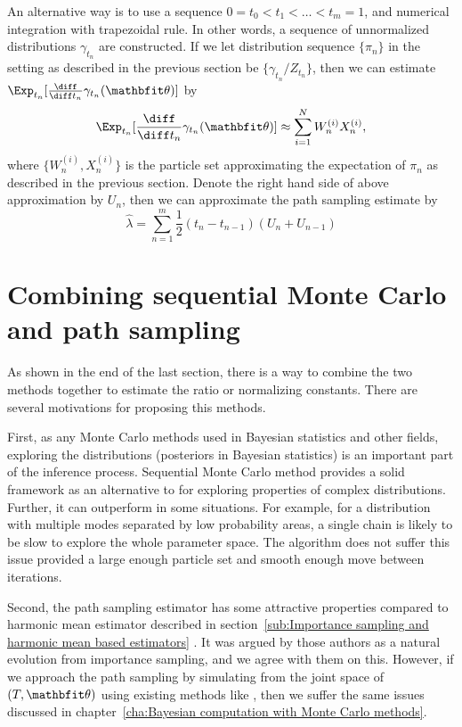 An alternative way is to use a sequence $0 = t_0 < t_1 < \dots < t_m = 1$, and
numerical integration with trapezoidal rule. In other words, a sequence of
unnormalized distributions $\gamma_{t_n}$ are constructed. If we let
distribution sequence $\{\pi_n\}$ in the \smc setting as described in the
previous section be $\{\gamma_{t_n}/Z_{t_n}\}$, then we can estimate
$\Exp_{t_n}[\frac{\diff}{\diff t_n}\gamma_{t_n}(\bth)]$ by
\begin{equation}
  \Exp_{t_n}[\frac{\diff}{\diff t_n}\gamma_{t_n}(\bth)]
  \approx \sum_{i=1}^NW_n^{(i)}X_n^{(i)},
\end{equation}
where $\{W_n^{(i)},X_n^{(i)}\}$ is the particle set approximating the
expectation of $\pi_n$ as described in the previous section. Denote the right
hand side of above approximation by $U_n$, then we can approximate the path
sampling estimate by
\begin{equation}
  \hat{\lambda} = \sum_{n = 1}^m \frac{1}{2}(t_{n} - t_{n-1})(U_n + U_{n-1})
\end{equation}

\section{Combining sequential Monte Carlo and path sampling}
\label{sec:Combining sequential Monte Carlo and path sampling}

As shown in the end of the last section, there is a way to combine the two
methods together to estimate the ratio or normalizing constants. There are
several motivations for proposing this methods.

First, as any Monte Carlo methods used in Bayesian statistics and other
fields, exploring the distributions (posteriors in Bayesian statistics) is an
important part of the inference process. Sequential Monte Carlo method
provides a solid framework as an alternative to \mcmc for exploring properties
of complex distributions. Further, it can outperform \mcmc in some situations.
For example, for a distribution with multiple modes separated by low
probability areas, a single chain \mha is likely to be slow to explore the
whole parameter space. The \smc algorithm does not suffer this issue provided
a large enough particle set and smooth enough move between iterations.

Second, the path sampling estimator has some attractive properties compared to
harmonic mean estimator described in section~\ref{sub:Importance sampling and
  harmonic mean based estimators} \parencite[see][]{Gelman1998}. It was argued
by those authors as a natural evolution from importance sampling, and we agree
with them on this. However, if we approach the path sampling by simulating
from the joint space of $(T,\bth)$ using existing methods like \mcmc, then we
suffer the same issues discussed in chapter~\ref{cha:Bayesian computation with
  Monte Carlo methods}.

